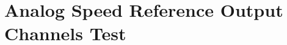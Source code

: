 \section{Analog Speed Reference Output Channels Test}\label{sec:analog-speed-reference-output-channels-test}